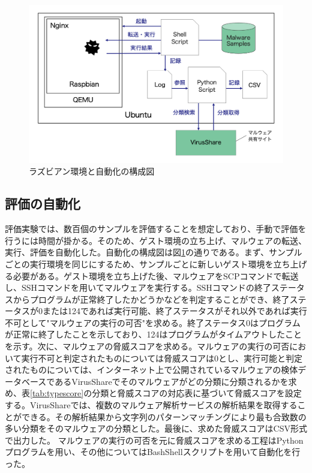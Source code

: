 \documentclass[12pt,a4paper,titlepage,report]{jsbook}
\begin{document}
\begin{figure}[htbp]
	\begin{center}
		\includegraphics[width=13cm]{img/exparch.png}
		\caption{ラズビアン環境と自動化の構成図}
		\label{fig:exparch}
	\end{center}
\end{figure}

\subsection{評価の自動化}
評価実験では、数百個のサンプルを評価することを想定しており、手動で評価を行うには時間が掛かる。そのため、ゲスト環境の立ち上げ、マルウェアの転送、実行、評価を自動化した。自動化の構成図は図\ref{fig:exparch}の通りである。まず、サンプルごとの実行環境を同じにするため、サンプルごとに新しいゲスト環境を立ち上げる必要がある。ゲスト環境を立ち上げた後、マルウェアをSCPコマンドで転送し、SSHコマンドを用いてマルウェアを実行する。SSHコマンドの終了ステータスからプログラムが正常終了したかどうかなどを判定することができ、終了ステータスが0または124であれば実行可能、終了ステータスがそれ以外であれば実行不可として"マルウェアの実行の可否"を求める。終了ステータス0はプログラムが正常に終了したことを示しており、124はプログラムがタイムアウトしたことを示す。次に、マルウェアの脅威スコアを求める。マルウェアの実行の可否において実行不可と判定されたものについては脅威スコアは0とし、実行可能と判定されたものについては、インターネット上で公開されているマルウェアの検体データベースであるVirusShareでそのマルウェアがどの分類に分類されるかを求め、表\ref{tab:typescore}の分類と脅威スコアの対応表に基づいて脅威スコアを設定する。VirusShareでは、複数のマルウェア解析サービスの解析結果を取得することができる。その解析結果から文字列のパターンマッチングにより最も合致数の多い分類をそのマルウェアの分類とした。最後に、求めた脅威スコアはCSV形式で出力した。
マルウェアの実行の可否を元に脅威スコアを求める工程はPythonプログラムを用い、その他についてはBashShellスクリプトを用いて自動化を行った。
\end{document}
